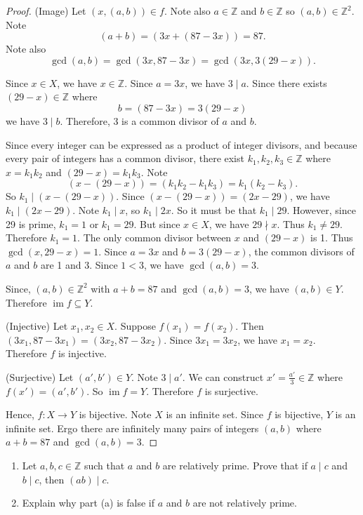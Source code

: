 \documentclass{article}
\newcommand{\Z}{\mathbb{Z}}
\DeclareMathOperator{\im}{im}
\theoremstyle{definition}
\begin{document}
\begin{solution}
\begin{enumerate}
\begin{proof}
(Image) Let $(x,(a,b))\in f$. Note also $a\in\Z$ and $b\in\Z$ so $(a,b)\in\Z^2$. Note
\[(a+b)=(3x+(87-3x))=87.\]
Note also
\[\gcd(a,b)=\gcd(3x,87-3x)=\gcd(3x,3(29-x)).\]

Since $x\in X$, we have $x\in\Z$. Since $a=3x$, we have $3\mid a$. Since there exists $(29-x)\in\Z$ where \[b=(87-3x)=3(29-x)\] we have $3\mid b$. Therefore, 3 is a common divisor of $a$ and $b$. 

Since every integer can be expressed as a product of integer divisors, and because every pair of integers has a common divisor, there exist $k_1,k_2,k_3\in\Z$ where $x=k_1k_2$ and $(29-x)=k_1k_3$. Note
\[(x-(29-x))=(k_1k_2-k_1k_3)=k_1(k_2-k_3).\]
So $k_1\mid(x-(29-x))$. Since $(x-(29-x))=(2x-29)$, we have $k_1\mid(2x-29)$. Note $k_1\mid x$, so $k_1\mid 2x$. So it must be that $k_1\mid 29$. However, since 29 is prime, $k_1=1$ or $k_1=29$. But since $x\in X$, we have $29\nmid x$. Thus $k_1\neq 29$. Therefore $k_1=1$. The only common divisor between $x$ and $(29-x)$ is 1. Thus $\gcd(x,29-x)=1$. Since $a=3x$ and $b=3(29-x)$, the common divisors of $a$ and $b$ are 1 and 3. Since $1<3$, we have $\gcd(a,b)=3$. 

Since, $(a,b)\in\Z^2$ with $a+b=87$ and $\gcd(a,b)=3$, we have $(a,b)\in Y$. Therefore $\im{f}\subseteq Y$.

(Injective) Let $x_1,x_2\in X$. Suppose $f(x_1)=f(x_2)$. Then $(3x_1,87-3x_1)=(3x_2,87-3x_2)$. Since $3x_1=3x_2$, we have $x_1=x_2$. Therefore $f$ is injective.

(Surjective) Let $(a',b')\in Y$. Note $3\mid a'$. We can construct $x'=\frac{a'}{3}\in\Z$ where $f(x')=(a',b')$. So $\im{f}=Y$. Therefore $f$ is surjective.

Hence, $f:X\to Y$ is bijective. Note $X$ is an infinite set. Since $f$ is bijective, $Y$ is an infinite set. Ergo there are infinitely many pairs of integers $(a,b)$ where $a+b=87$ and $\gcd(a,b)=3$.
\end{proof}
\end{enumerate}
\end{solution}
\begin{question}
    \begin{enumerate}
        \item Let $a, b, c\in \Z$ such that $a$ and $b$ are relatively prime. Prove that if $a\mid c$ and $b\mid c$, then $(ab)\mid c$.
        \item Explain why part (a) is false if $a$ and $b$ are not relatively prime.
    \end{enumerate}
\end{question}
\end{document}
